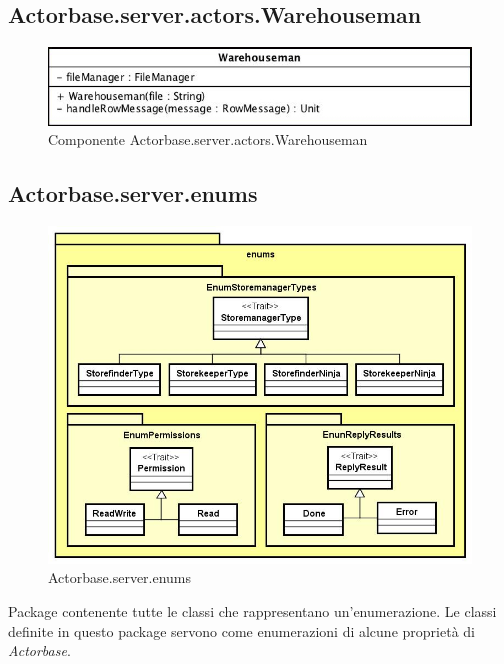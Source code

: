 \documentclass[a4paper]{article}
\begin{document}
			
	\subsection{Actorbase.server.actors.Warehouseman}
		\begin{figure}[H]
			\centering
			\includegraphics[scale = 0.6]{Server/warehouseman.jpg}
			\caption{Componente Actorbase.server.actors.Warehouseman}
		\end{figure}
			
		\subsection{Actorbase.server.enums}
		\begin{figure}[H]
			\centering
			\includegraphics[scale = 0.6]{Server/enumsLevel.jpg}
			\caption{Actorbase.server.enums}
		\end{figure}
		Package contenente tutte le classi che rappresentano un'enumerazione. Le classi definite in questo package servono come enumerazioni di alcune proprietà di \emph{Actorbase}.
		
\end{document}
